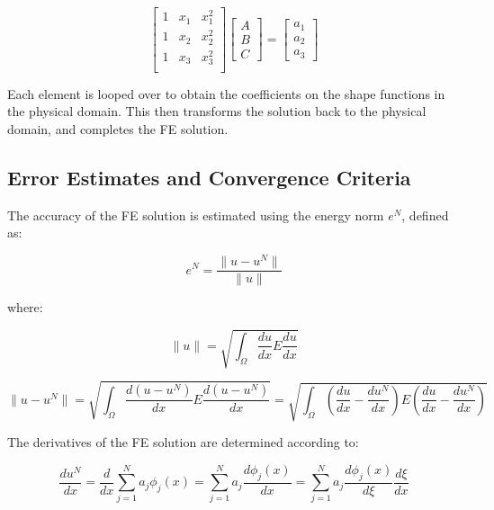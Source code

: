 \documentclass[10pt]{article}
\begin{document}
\begin{equation}
\label{eq:LinearSolve}
\begin{bmatrix}
1 & x_1 & x_1^2\\
1 & x_2 & x_2^2\\
1 & x_3 & x_3^2\\
\end{bmatrix}
\begin{bmatrix} A\\ B\\ C
\end{bmatrix}
=
\begin{bmatrix} a_1 \\ a_2 \\ a_3
\end{bmatrix}
\end{equation}

Each element is looped over to obtain the coefficients on the shape functions in the physical domain. This then transforms the solution back to the physical domain, and completes the FE solution.

\subsection{Error Estimates and Convergence Criteria}

The accuracy of the FE solution is estimated using the energy norm \(e^N\), defined as:

\begin{equation}
e^N=\frac{\|u-u^N\|}{\|u\|}
\end{equation}

where:

\begin{equation}
\|u\|=\sqrt{\int_{\Omega}^{}\frac{du}{dx}E\frac{du}{dx}}
\end{equation}

\begin{equation}
\|u-u^N\|=\sqrt{\int_{\Omega}^{}\frac{d(u-u^N)}{dx}E\frac{d(u-u^N)}{dx}}=\sqrt{\int_{\Omega}^{}\left(\frac{du}{dx}-\frac{du^N}{dx}\right)E\left(\frac{du}{dx}-\frac{du^N}{dx}\right)}
\end{equation}

The derivatives of the FE solution are determined according to:

\begin{equation}
\frac{du^N}{dx}=\frac{d}{dx}\sum_{j=1}^{N}a_j\phi_j(x)=\sum_{j=1}^{N}a_j\frac{d\phi_j(x)}{dx}=\sum_{j=1}^{N}a_j\frac{d\phi_j(x)}{d\xi}\frac{d\xi}{dx}
\end{equation}
\end{document}

